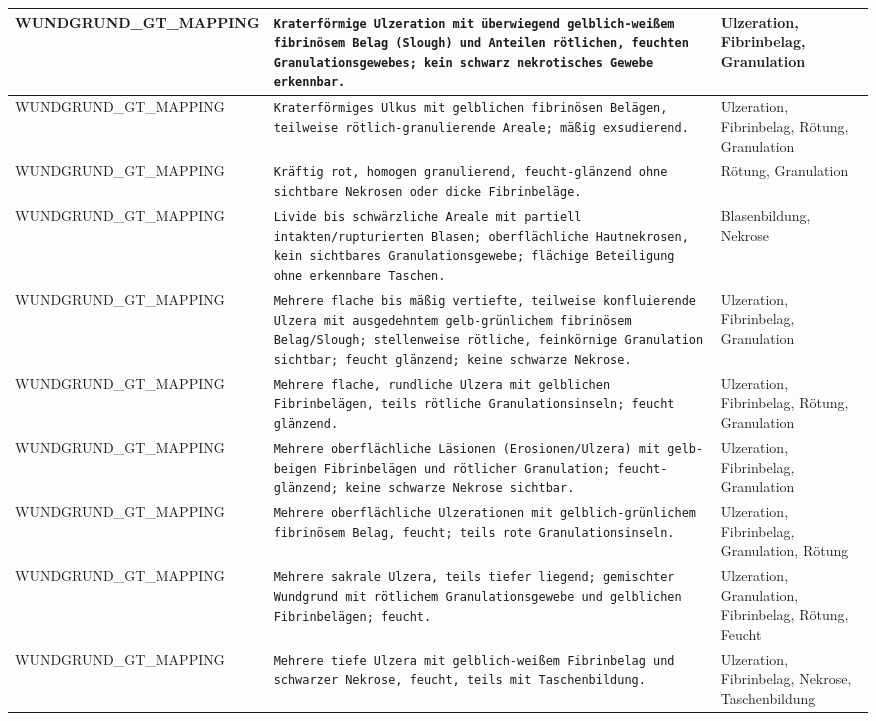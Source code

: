 \begin{longtable}{|p{3.5cm}|p{5cm}|p{6.5cm}|}
WUNDGRUND\_GT\_MAPPING & \texttt{Kraterförmige Ulzeration mit überwiegend gelblich-weißem fibrinösem Belag (Slough) und Anteilen rötlichen, feuchten Granulationsgewebes; kein schwarz nekrotisches Gewebe erkennbar.} & Ulzeration, Fibrinbelag, Granulation \\ \hline
WUNDGRUND\_GT\_MAPPING & \texttt{Kraterförmiges Ulkus mit gelblichen fibrinösen Belägen, teilweise rötlich-granulierende Areale; mäßig exsudierend.} & Ulzeration, Fibrinbelag, Rötung, Granulation \\ \hline
WUNDGRUND\_GT\_MAPPING & \texttt{Kräftig rot, homogen granulierend, feucht-glänzend ohne sichtbare Nekrosen oder dicke Fibrinbeläge.} & Rötung, Granulation \\ \hline
WUNDGRUND\_GT\_MAPPING & \texttt{Livide bis schwärzliche Areale mit partiell intakten/rupturierten Blasen; oberflächliche Hautnekrosen, kein sichtbares Granulationsgewebe; flächige Beteiligung ohne erkennbare Taschen.} & Blasenbildung, Nekrose \\ \hline
WUNDGRUND\_GT\_MAPPING & \texttt{Mehrere flache bis mäßig vertiefte, teilweise konfluierende Ulzera mit ausgedehntem gelb-grünlichem fibrinösem Belag/Slough; stellenweise rötliche, feinkörnige Granulation sichtbar; feucht glänzend; keine schwarze Nekrose.} & Ulzeration, Fibrinbelag, Granulation \\ \hline
WUNDGRUND\_GT\_MAPPING & \texttt{Mehrere flache, rundliche Ulzera mit gelblichen Fibrinbelägen, teils rötliche Granulationsinseln; feucht glänzend.} & Ulzeration, Fibrinbelag, Rötung, Granulation \\ \hline
WUNDGRUND\_GT\_MAPPING & \texttt{Mehrere oberflächliche Läsionen (Erosionen/Ulzera) mit gelb-beigen Fibrinbelägen und rötlicher Granulation; feucht-glänzend; keine schwarze Nekrose sichtbar.} & Ulzeration, Fibrinbelag, Granulation \\ \hline
WUNDGRUND\_GT\_MAPPING & \texttt{Mehrere oberflächliche Ulzerationen mit gelblich-grünlichem fibrinösem Belag, feucht; teils rote Granulationsinseln.} & Ulzeration, Fibrinbelag, Granulation, Rötung \\ \hline
WUNDGRUND\_GT\_MAPPING & \texttt{Mehrere sakrale Ulzera, teils tiefer liegend; gemischter Wundgrund mit rötlichem Granulationsgewebe und gelblichen Fibrinbelägen; feucht.} & Ulzeration, Granulation, Fibrinbelag, Rötung, Feucht \\ \hline
WUNDGRUND\_GT\_MAPPING & \texttt{Mehrere tiefe Ulzera mit gelblich-weißem Fibrinbelag und schwarzer Nekrose, feucht, teils mit Taschenbildung.} & Ulzeration, Fibrinbelag, Nekrose, Taschenbildung \\ \hline

\end{longtable}
